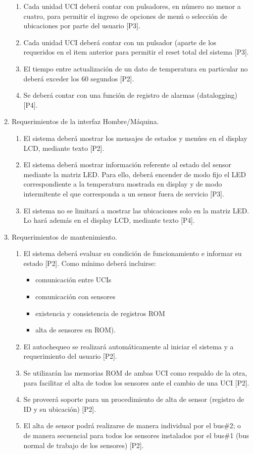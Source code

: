 \documentclass[
11pt, %
codirector, %
]{charter}
\begin{document}
\begin{enumerate}
\begin{enumerate}
		\item Cada unidad UCI deberá contar con pulsadores, en número no menor a cuatro, para permitir el ingreso de opciones de menú o selección de ubicaciones por parte del usuario [P3].
\item Cada unidad UCI deberá contar con un pulsador (aparte de los requeridos en el item anterior para permitir el reset total del sistema [P3].
\item El tiempo entre actualización de un dato de temperatura en particular no deberá exceder los 60 segundos [P2].
\item Se deberá contar con una función de registro de alarmas (datalogging) [P4].
\end{enumerate}



		\item Requerimientos de la interfaz Hombre/Máquina.
		
\begin{enumerate}
\item El sistema deberá mostrar los mensajes de estados y menúes en el display LCD, mediante texto [P2].
\item El sistema deberá mostrar información referente al estado del sensor mediante la matriz LED. Para ello, deberá encender de modo fijo el LED correspondiente a la temperatura mostrada en display y de modo intermitente el que corresponda a un sensor fuera de servicio [P3].
\item El sistema no se limitará a mostrar las ubicaciones solo en la matriz LED. Lo hará además en el display LCD, mediante texto [P4].
\end{enumerate}

		
		\item Requerimientos de mantenimiento.
\begin{enumerate}
\item El sistema deberá evaluar su condición de funcionamiento e informar su estado [P2]. Como mínimo deberá incluirse:
\begin {itemize}
	\item comunicación entre UCIs
	\item comunicación con sensores
	\item existencia y consistencia de registros ROM
	\item alta de sensores en ROM).
\end{itemize}
\item El autochequeo se realizará automáticamente al iniciar el sistema y a requerimiento del usuario [P2]. 
\item Se utilizarán las memorias ROM de ambas UCI como respaldo de la otra, para facilitar el alta de todos los sensores ante el cambio de una UCI [P2].
\item Se proveerá soporte para un procedimiento de alta de sensor (registro de ID y su ubicación) [P2].
\item El alta de sensor podrá realizarse de manera individual por el bus\#2; o de manera secuencial para todos los sensores instalados por el bus\#1 (bus normal de trabajo de los sensores) [P2]. 
\end{enumerate}		


\end{enumerate}
\end{document}
